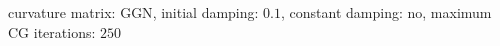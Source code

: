 curvature matrix: $\text{GGN}$, initial damping: $\num[scientific-notation=true]{0.1}$, constant damping: $\text{no}$, maximum CG iterations: $\num[scientific-notation=false]{250}$